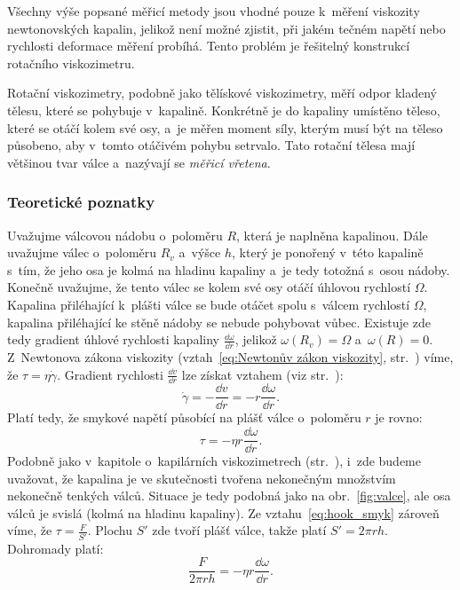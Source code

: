 \documentclass[12pt]{article}
\begin{document}
Všechny výše popsané měřicí metody jsou vhodné pouze k~měření viskozity newtonovských kapalin, jelikož není možné zjistit, při jakém tečném napětí nebo rychlosti deformace měření probíhá. Tento problém je řešitelný konstrukcí rotačního viskozimetru.
\par\noindent
Rotační viskozimetry, podobně jako tělískové viskozimetry, měří odpor kladený tělesu, které se pohybuje v~kapalině. Konkrétně je do kapaliny umístěno těleso, které se otáčí kolem své osy, a~je měřen moment síly, kterým musí být na těleso působeno, aby v~tomto otáčivém pohybu setrvalo. Tato rotační tělesa mají většinou tvar válce a~nazývají se \emph{měřicí vřetena}.

\subsubsection{Teoretické poznatky}%

Uvažujme válcovou nádobu o~poloměru $R$, která je naplněna kapalinou. Dále uvažujme válec o~poloměru $R_v$ a~výšce $h$, který je ponořený v~této kapalině s~tím, že jeho osa je kolmá na hladinu kapaliny a~je tedy totožná s~osou nádoby. Konečně uvažujme, že tento válec se kolem své osy otáčí úhlovou rychlostí $\Omega$. Kapalina přiléhající k~plášti válce se bude otáčet spolu s~válcem rychlostí $\Omega$, kapalina přiléhající ke stěně nádoby se nebude pohybovat vůbec. Existuje zde tedy gradient úhlové rychlosti kapaliny $\frac{\dd\omega}{\dd r}$, jelikož $\omega(R_v) = \Omega$ a~$\omega(R) = 0$.\label{eq:Uhlova_rychlost} Z~Newtonova zákona viskozity (vztah~\ref{eq:Newtonův zákon viskozity}, str.~\pageref{eq:Newtonův zákon viskozity}) víme, že $\tau = \eta\dot\gamma$. Gradient rychlosti $\frac{\dd v}{\dd r}$ lze získat vztahem (viz str.~\pageref{eq:gamma_gradient}):
\begin{equation}
    \dot\gamma = -\frac{\dd v}{\dd r} = -r\frac{\dd\omega}{\dd r}\text{.}
\end{equation}
Platí tedy, že smykové napětí působící na plášť válce o~poloměru $r$ je rovno:
\begin{equation}
    \tau = -\eta r\frac{\dd\omega}{\dd r}\text{.}
\end{equation}
Podobně jako v~kapitole o~kapilárních viskozimetrech (str.~\pageref{eq:gamma_gradient}), i~zde budeme uvažovat, že kapalina je ve skutečnosti tvořena nekonečným množstvím nekonečně tenkých válců. Situace je tedy podobná jako na obr.~\ref{fig:valce}, ale osa válců je svislá (kolmá na hladinu kapaliny).
Ze vztahu~\ref{eq:hook_smyk} zároveň víme, že $\tau = \frac{F}{S'}$. Plochu $S'$ zde tvoří plášť válce, takže platí $S' = 2\pi rh$. Dohromady platí:
\begin{equation}
    \frac{F}{2\pi rh} = -\eta r\frac{\dd\omega}{\dd r}\text{.}
\end{equation}
\end{document}
